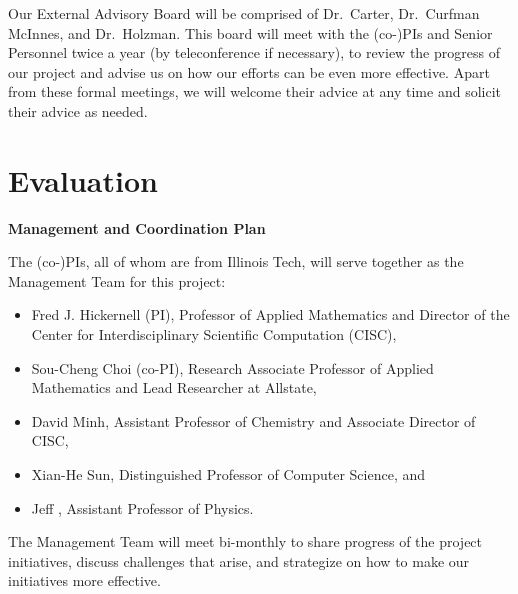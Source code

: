 \documentclass[11pt]{NSFamsart}
\begin{document}
Our External Advisory Board will be comprised of Dr.~Carter, Dr.~Curfman McInnes, and Dr.~Holzman.  This board will meet with the (co-)PIs and Senior Personnel twice a year (by teleconference if necessary), to review the progress of our project and advise us on how our efforts can be even more effective.  Apart from these formal meetings, we will welcome their advice at any time and solicit their advice as needed.

\section{Evaluation}



\newpage \setcounter{page}{1} %





{\renewcommand\addcontentsline[3]{} 
\renewcommand{\refname}{{\Large\textbf{References Cited}}}                   %
\renewcommand{\bibliofont}{\normalsize}

}

\newpage \setcounter{page}{1} %

\centerline{\textbf{\Large Management and Coordination Plan}}



\bigskip

The (co-)PIs, all of whom are from Illinois Tech, will serve together as the Management Team for this project:
\begin{itemize}
\item Fred J. Hickernell (PI), Professor of Applied Mathematics and Director of the Center for Interdisciplinary Scientific Computation (CISC), 
\item Sou-Cheng Choi (co-PI), Research Associate Professor of Applied Mathematics and Lead Researcher at Allstate,
\item David Minh, Assistant Professor of Chemistry and Associate Director of CISC,
\item Xian-He Sun, Distinguished Professor of Computer Science, and 
\item Jeff \JW, Assistant Professor of Physics. 
\end{itemize}
The Management Team will meet bi-monthly to share progress of the project initiatives, discuss challenges that arise, and strategize on how to make our initiatives more effective.
\end{document}
